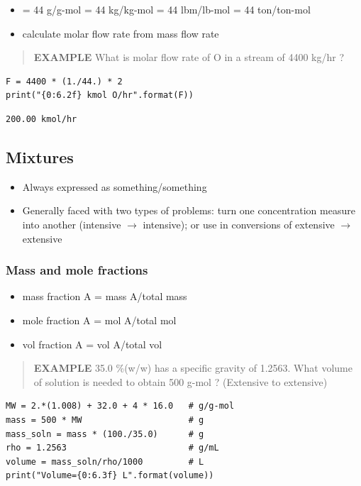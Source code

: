 \documentclass[11pt]{article}
\begin{document}
\begin{itemize}
\item {} = 44 g/g-mol = 44 kg/kg-mol = 44 lbm/lb-mol = 44 ton/ton-mol
\item calculate molar flow rate from mass flow rate
\end{itemize}
\begin{quote}
\textbf{EXAMPLE} What is molar flow rate of O in a stream of 4400 kg/hr ?
\end{quote}

\begin{verbatim}
F = 4400 * (1./44.) * 2
print("{0:6.2f} kmol O/hr".format(F))
\end{verbatim}

\begin{verbatim}
200.00 kmol/hr
\end{verbatim}

\subsection{Mixtures}
\label{sec-4-5}
\begin{itemize}
\item Always expressed as something/something
\item Generally faced with two types of problems: turn one concentration measure into another (intensive $\to$ intensive); or use in conversions of extensive $\to$ extensive
\end{itemize}
\subsubsection{Mass and mole fractions}
\label{sec-4-5-1}
\begin{itemize}
\item mass fraction A = mass A/total mass
\item mole fraction A = mol A/total mol
\item vol fraction A = vol A/total vol
\end{itemize}

\begin{quote}
\textbf{EXAMPLE} 35.0 \%(w/w)  has a specific gravity of 1.2563.  What volume of solution is needed to obtain 500 g-mol ? (Extensive to extensive)
\end{quote}
\begin{verbatim}
MW = 2.*(1.008) + 32.0 + 4 * 16.0   # g/g-mol
mass = 500 * MW                     # g
mass_soln = mass * (100./35.0)      # g
rho = 1.2563                        # g/mL
volume = mass_soln/rho/1000         # L
print("Volume={0:6.3f} L".format(volume))
\end{verbatim}
\end{document}

